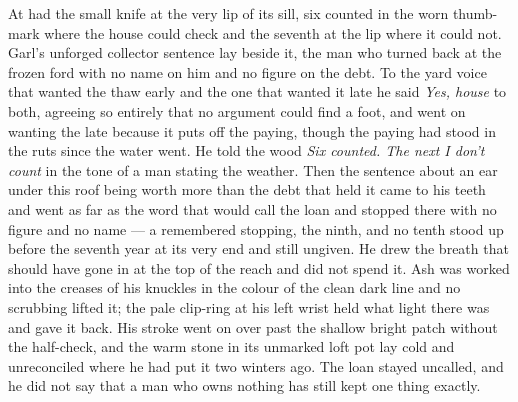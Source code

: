 At   had the small knife at the very lip of its sill, six counted in the worn thumb-mark where the house could check and the seventh at the lip where it could not. Garl's unforged collector sentence lay beside it, the man who turned back at the frozen ford with no name on him and no figure on the debt. To the yard voice that wanted the thaw early and the one that wanted it late he said \emph{Yes, house} to both, agreeing so entirely that no argument could find a foot, and went on wanting the late because it puts off the paying, though the paying had stood in the ruts since the water went. He told the wood \emph{Six counted. The next I don't count} in the tone of a man stating the weather. Then the sentence about an ear under this roof being worth more than the debt that held it came to his teeth and went as far as the word that would call the loan and stopped there with no figure and no name --- a remembered stopping, the ninth, and no tenth stood up before the seventh year at its very end and still ungiven. He drew the breath that should have gone in at the top of the reach and did not spend it. Ash was worked into the creases of his knuckles in the colour of the clean dark line and no scrubbing lifted it; the pale clip-ring at his left wrist held what light there was and gave it back. His stroke went on over  past the shallow bright patch without the half-check, and the warm stone in its unmarked loft pot lay cold and unreconciled where he had put it two winters ago. The loan stayed uncalled, and he did not say that a man who owns nothing has still kept one thing exactly.


